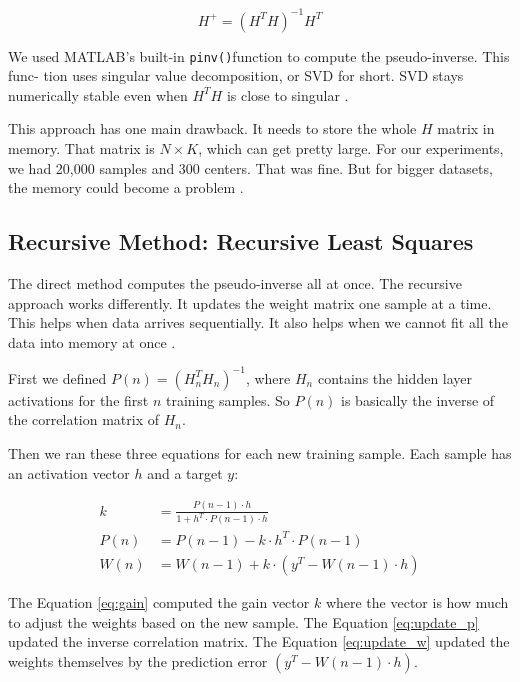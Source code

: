\documentclass[12pt]{article}
\begin{document}
\begin{equation}
	H^{+} = (H^T H)^{-1} H^T
	\label{eq:pseudoinverse}
\end{equation}

We used MATLAB’s built-in \texttt{pinv()}function to compute the pseudo-inverse. This func-
tion uses singular value decomposition, or SVD for short. SVD stays numerically stable even
when $H^T H$ is close to singular  \cite{broomhead1988}.

This approach has one main drawback. It needs to store the whole $H$ matrix in memory.
That matrix is $N \times K$, which can get pretty large. For our experiments, we had 20,000 samples and 300 centers. That was fine. But for bigger datasets, the memory could become
a problem \cite{haykin2009}.


\subsection{Recursive Method: Recursive Least Squares}

The direct method computes the pseudo-inverse all at once. The recursive approach works differently. It updates the weight matrix one sample at a time. This helps when data arrives sequentially. It also helps when we cannot fit all the data into memory at once \cite{haykin2009}.

First we defined $P(n) = (H_n^T H_n)^{-1}$, where $H_n$ contains the hidden layer activations for the first $n$ training samples. So $P(n)$ is basically the inverse of the correlation matrix of $H_n$.

Then we ran these three equations for each new training sample. Each sample has an activation vector $h$ and a target $y$:

\begin{align}
	k &= \frac{P(n-1) \cdot h}{1 + h^T \cdot P(n-1) \cdot h} \label{eq:gain} \\
	P(n) &= P(n-1) - k \cdot h^T \cdot P(n-1) \label{eq:update_p} \\
	W(n) &= W(n-1) + k \cdot (y^T - W(n-1) \cdot h) \label{eq:update_w}
\end{align}

The Equation \eqref{eq:gain} computed the gain vector $k$ where the vector is how much to adjust the weights based on the new sample. The Equation \eqref{eq:update_p} updated the inverse correlation matrix. The Equation \eqref{eq:update_w} updated the weights themselves by the prediction error $(y^T - W(n-1) \cdot h)$.
\end{document}
